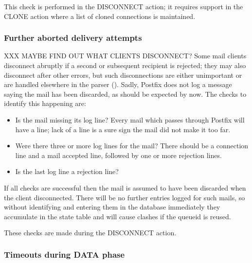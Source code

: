 This check is performed in the DISCONNECT action; it requires support in
the CLONE action where a list of cloned connections is maintained.

\subsubsection{Further aborted delivery attempts}

XXX MAYBE FIND OUT WHAT CLIENTS DISCONNECT\@?  Some mail clients disconnect
abruptly if a second or subsequent recipient is rejected; they may also
disconnect after other errors, but such disconnections are either
unimportant or are handled elsewhere in the parser
().  Sadly, Postfix does not log a
message saying the mail has been discarded, as should be expected by now.
The checks to identify this happening are:

\begin{itemize}

    \item Is the mail missing its  log line?  Every mail
        which passes through Postfix will have a  line;
        lack of a  line is a sure sign the mail did not
        make it too far.

    \item Were there three or more  log lines for the mail?
        There should be a connection line and a mail accepted line,
        followed by one or more rejection lines.

    \item Is the last  log line a rejection line?

\end{itemize}

If all checks are successful then the mail is assumed to have been
discarded when the client disconnected.  There will be no further entries
logged for such mails, so without identifying and entering them in the
database immediately they accumulate in the state table and will cause
clashes if the queueid is reused.

These checks are made during the DISCONNECT action.

\subsubsection{Timeouts during DATA phase}

\label{timeouts-during-data-phase}

